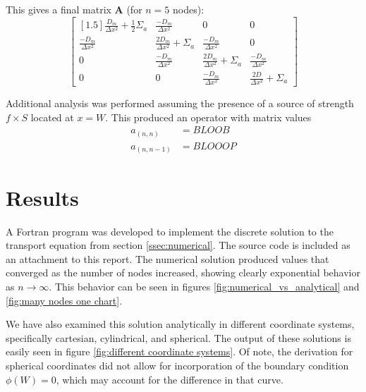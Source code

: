 \documentclass[10pt,peerreviewca]{IEEEtran} %
\newcommand{\opmat}[1]{\mathbf{#1}}
\begin{document}
	This gives a final matrix $\opmat{A}$ (for $n=5$ nodes):
	\[
	\begin{bmatrix}[1.5]
		\frac{D_m}{\Delta x^2} + \frac{1}{2}\Sigma_a & \frac{-D_m}{\Delta x^2} & 0 & 0 \\
		\frac{-D_m}{\Delta x^2} & \frac{2D_m}{\Delta x^2} + \Sigma_a & \frac{-D_m}{\Delta x^2} & 0 \\
		0 & \frac{-D_m}{\Delta x^2} & \frac{2D_m}{\Delta x^2} + \Sigma_a & \frac{-D_m}{\Delta x^2} \\
		0 & 0 & \frac{-D_m}{\Delta x^2} & \frac{2D}{\Delta x^2} + \Sigma_a
	\end{bmatrix}
	\]

	Additional analysis was performed assuming the presence of a source of strength $f \times S$ located at $x=W$. This produced an operator with matrix values
	\begin{align*}
		a_{\left( n, n \right)} &= BLOOB \\
		a_{\left( n, n-1 \right)} &= BLOOOP
	\end{align*}

	\section{Results}
	A Fortran program was developed to implement the discrete solution to the transport equation from section \ref{ssec:numerical}. The source code is included as an attachment to this report. The numerical solution produced values that converged as the number of nodes increased, showing clearly exponential behavior as $n\rightarrow\infty$. This behavior can be seen in figures \ref{fig:numerical_vs_analytical} and \ref{fig:many nodes one chart}. 

	We have also examined this solution analytically in different coordinate systems, specifically cartesian, cylindrical, and spherical. The output of these solutions is easily seen in figure \ref{fig:different coordinate systems}. Of note, the derivation for spherical coordinates did not allow for incorporation of the boundary condition $\phi(W)=0$, which may account for the difference in that curve. 
\end{document}

